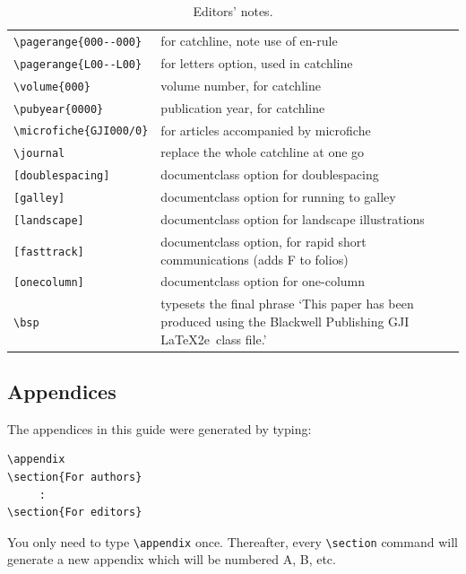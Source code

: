 \documentclass{gji}
\begin{document}
\begin{table}
\begin{minipage}{130mm}
\caption{Editors' notes.}
\label{editors}
\begin{tabular}{@{}lp{270pt}}
\verb"\pagerange{000--000}"& for catchline, note use of en-rule\\
\verb"\pagerange{L00--L00}"& for letters option, used in catchline\\
\verb"\volume{000}" & volume number, for catchline\\
\verb"\pubyear{0000}" & publication year, for catchline\\
\verb"\microfiche{GJI000/0}" & for articles accompanied by microfiche\\
\verb"\journal" & replace the whole catchline at one go\\
\verb"[doublespacing]" & documentclass option for doublespacing\\
\verb"[galley]" & documentclass option for running to galley\\
\verb"[landscape]" & documentclass option for landscape illustrations\\
\verb"[fasttrack]" & documentclass option, for rapid short communications
                   (adds F to folios)\\
\verb"[onecolumn]" & documentclass option for one-column \\
\verb"\bsp"& typesets the final phrase `This paper has been produced
 using the Blackwell Publishing GJI \LaTeX2e\ class file.'\\
\end{tabular}
\end{minipage}
\end{table}

\subsection{Appendices}

The appendices in this guide were generated by typing:
\begin{verbatim}
\appendix
\section{For authors}
     :
\section{For editors}
\end{verbatim}
You only need to type \verb"\appendix" once. Thereafter, every
\verb"\section" command will generate a new appendix which will be
numbered A, B, etc.
\end{document}
